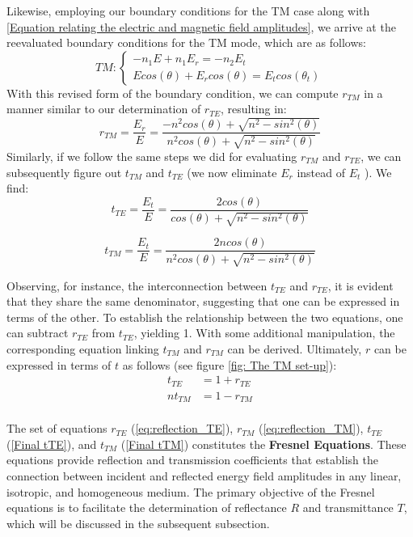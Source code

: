 Likewise, employing our boundary conditions for the TM case along with \ref{Equation relating the electric and magnetic field amplitudes}, we arrive at the reevaluated boundary conditions for the TM mode, which are as follows:
\begin{equation}
TM:
\begin{cases} \label{TM boundary conditions}
  -n_1E + n_1E_r = -n_2E_t \\
  Ecos(\theta) + E_rcos(\theta) = E_tcos(\theta_t)
\end{cases}
\end{equation}
With this revised form of the boundary condition, we can compute $r_{TM}$ in a manner similar to our determination of $r_{TE}$, resulting in:
\begin{equation} \label{eq:reflection_TM}
r_{TM} = \frac{E_r}{E} = \frac{-n^2cos(\theta) + \sqrt{n^2 - sin^2(\theta)}}{n^2cos(\theta) + \sqrt{n^2 - sin^2(\theta)}}
\end{equation}
Similarly, if we follow the same steps we did for evaluating $r_{TM}$ and $r_{TE}$, we can subsequently figure out $t_{TM}$ and $t_{TE}$ (we now eliminate $E_r$ instead of $E_t$ ). We find:
\begin{equation} \label{Final tTE}
t_{TE} = \frac{E_t}{E} = \frac{2cos(\theta)}{cos(\theta) + \sqrt{n^2 - sin^2(\theta)}}
\end{equation}

\begin{equation} \label{Final tTM}
t_{TM} = \frac{E_t}{E} = \frac{2ncos(\theta)}{n^2cos(\theta) + \sqrt{n^2 - sin^2(\theta)}}
\end{equation}

Observing, for instance, the interconnection between $t_{TE}$ and $r_{TE}$, it is evident that they share the same denominator, suggesting that one can be expressed in terms of the other. To establish the relationship between the two equations, one can subtract $r_{TE}$ from $t_{TE}$, yielding 1. With some additional manipulation, the corresponding equation linking $t_{TM}$ and $r_{TM}$ can be derived. Ultimately, $r$ can be expressed in terms of $t$ as follows (see figure \ref{fig: The TM set-up}):
\begin{align*}
    t_{TE} &= 1 + r_{TE} \\
    nt_{TM} &= 1 - r_{TM} \\
\end{align*}

The set of equations $r_{TE}$ (\ref{eq:reflection_TE}), $r_{TM}$ (\ref{eq:reflection_TM}), $t_{TE}$ (\ref{Final tTE}), and $t_{TM}$ (\ref{Final tTM}) constitutes the \textbf{Fresnel Equations}. These equations provide reflection and transmission coefficients that establish the connection between incident and reflected energy field amplitudes in any linear, isotropic, and homogeneous medium. The primary objective of the Fresnel equations is to facilitate the determination of reflectance $R$ and transmittance $T$, which will be discussed in the subsequent subsection.

